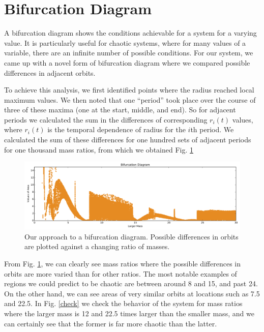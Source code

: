 \documentclass{article}
\begin{document}
\section*{Bifurcation Diagram}

A bifurcation diagram shows the conditions achievable for a system for a varying value.  It is particularly useful for chaotic systems, where for many values of a variable, there are an infinite number of possible conditions.  For our system, we came up with a novel form of bifurcation diagram where we compared possible differences in adjacent orbits.

To achieve this analysis, we first identified points where the radius reached local maximum values.  We then noted that one ``period'' took place over the course of three of these maxima (one at the start, middle, and end).  So for adjacent periods we calculated the sum in the differences of corresponding $r_{i}(t)$ values, where $r_{i}(t)$ is the temporal dependence of radius for the $i$th period.  We calculated the sum of these differences for one hundred sets of adjacent periods for one thousand mass ratios, from which we obtained Fig. \ref{bifurcation}

\begin{figure}[h]
\centering
\includegraphics[width=\textwidth]{bifurcation}
\caption{Our approach to a bifurcation diagram.  Possible differences in orbits are plotted against a changing ratio of masses.}
\label{bifurcation}
\end{figure}

From Fig. \ref{bifurcation}, we can clearly see mass ratios where the possible differences in orbits are more varied than for other ratios.  The most notable examples of regions we could predict to be chaotic are between around 8 and 15, and past 24.  On the other hand, we can see areas of very similar orbits at locations such as 7.5 and 22.5.  In Fig. \ref{check} we check the behavior of the system for mass ratios where the larger mass is 12 and 22.5 times larger than the smaller mass, and we can certainly see that the former is far more chaotic than the latter.
\end{document}
